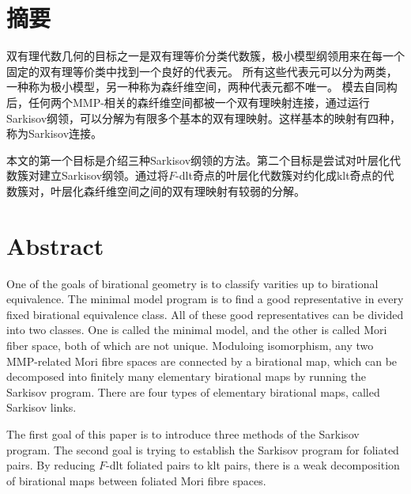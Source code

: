 

\maketitle%
\MAKETITLE%
\makedeclaration%


\intobmk\chapter*{摘\quad 要}%
\setcounter{page}{1}%

双有理代数几何的目标之一是双有理等价分类代数簇，极小模型纲领用来在每一个固定的双有理等价类中找到一个良好的代表元。
所有这些代表元可以分为两类，一种称为极小模型，另一种称为森纤维空间，两种代表元都不唯一。
模去自同构后，任何两个MMP-相关的森纤维空间都被一个双有理映射连接，通过运行Sarkisov纲领，可以分解为有限多个基本的双有理映射。这样基本的映射有四种，称为Sarkisov连接。

本文的第一个目标是介绍三种Sarkisov纲领的方法。第二个目标是尝试对叶层化代数簇对建立Sarkisov纲领。通过将$F$-dlt奇点的叶层化代数簇对约化成klt奇点的代数簇对，叶层化森纤维空间之间的双有理映射有较弱的分解。 


\intobmk\chapter*{Abstract}%

One of the goals of birational geometry is to classify varities up to birational equivalence. The minimal model program  is to find a good representative in every fixed birational equivalence class. 
All of these good representatives can be divided into two classes. One is called the minimal model, and the other is called Mori fiber space, both of  which are not unique. 
Moduloing isomorphism, any two MMP-related Mori fibre spaces are connected by a birational map, which can be decomposed into finitely many  elementary birational maps by running the Sarkisov program. There are four types of elementary birational maps, called Sarkisov links.

The first goal of this paper is to introduce three methods of the Sarkisov program.
The second goal is trying to establish the Sarkisov program for foliated pairs. By reducing $F$-dlt foliated pairs to klt pairs, there is a weak decomposition of birational maps between foliated Mori fibre spaces.  


\cleardoublepage\pagestyle{frontmatterstyle}%

